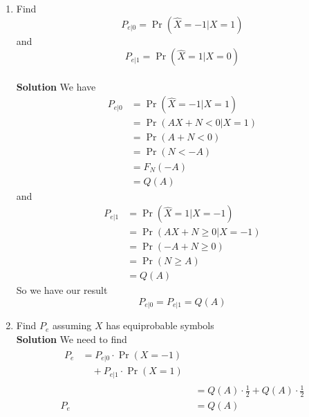\documentclass[journal, 12pt, twocolumn]{IEEEtran}
\providecommand{\pr}[1]{\ensuremath{\Pr\left(#1\right)}}
\begin{document}
\begin{enumerate}[label=\arabic{section}.\arabic*]
    \item
        Find
        \begin{equation}
            P_{e|0} = \pr{\hat{X} = -1 | X = 1}
        \end{equation}
        and
        \begin{equation}
            P_{e|1} = \pr{\hat{X} = 1 | X = 0}
        \end{equation}
        \\
        \textbf{Solution} We have
        \begin{align}
            P_{e|0} &= \pr{\hat{X} = -1 | X = 1} \\
            &= \pr{AX + N < 0 | X = 1} \\
            &= \pr{A + N < 0} \\
            &= \pr{N < -A} \\
            &= F_N(-A) \\
            &= Q(A)
        \end{align}
        and
        \begin{align}
            P_{e|1} &= \pr{\hat{X} = 1 | X = -1} \\
            &= \pr{AX + N \geq 0 | X = -1} \\
            &= \pr{-A + N \geq 0} \\
            &= \pr{N \geq A} \\
            &= Q(A)
        \end{align}
        So we have our result
        \begin{equation}
            P_{e|0} = P_{e|1} = Q(A)
        \end{equation}

    \item
        Find $P_e$ assuming $X$ has equiprobable symbols
        \\
        \textbf{Solution} We need to find
        \begin{align}
        \begin{split}
            P_e &= P_{e|0} \cdot \pr{X = -1} \\
            &\quad+ P_{e|1} \cdot \pr{X = 1}
        \end{split} \\
            &= Q(A) \cdot \frac{1}{2} + Q(A) \cdot \frac{1}{2} \\
            P_e &= Q(A)
        \end{align}


\end{enumerate}
\end{document}
